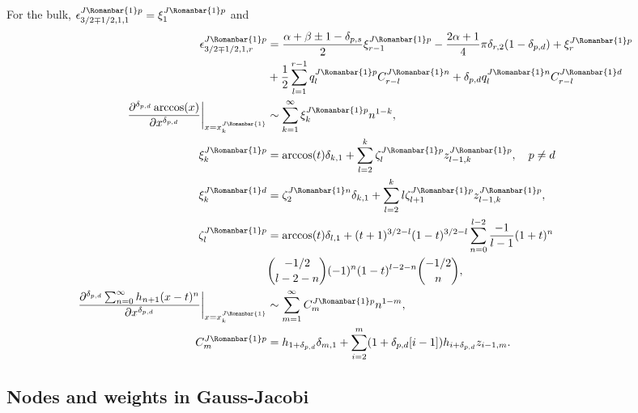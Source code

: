\documentclass[11pt]{article}
\newcommand*{\todo}[1]{{\color{red}?? TODO: #1 ??}}
\newcommand{\lln}{L{\tiny\Rleft} n}
\newcommand{\qj}{J}
\newcommand{\rb}{{\scriptsize \Romanbar{1}} }
\newcommand{\rl}{{\scriptsize \Romanbar{4}} }
\newcommand{\pg}{p}
\newcommand{\pn}{n}
\newcommand{\pd}{d}
\newcommand{\ps}{s}
\numberwithin{equation}{section}
\newcommand{\Rleft}{\Romanbar{4}}
\begin{document}
For the bulk, $\epsilon_{3/2 \mp 1/2,1,1}^{\qj\rb\pg} = \xi_{1}^{\qj\rb\pg}$ and
\begin{align}
	\epsilon_{3/2 \mp 1/2,1,r}^{\qj\rb\pg} & = \frac{\alpha +\beta \pm 1 -\delta_{\pg,\ps} }{2}\xi_{r-1}^{\qj\rb\pg} -\frac{2\alpha +1}{4} \pi \delta_{r,2} (1-\delta_{\pg,\pd}) + \xi_r^{\qj\rb\pg} \\
	& +\frac{1}{2} \sum_{l=1}^{r-1} q_l^{\qj\rb\pg} C_{r-l}^{\qj\rb\pn} + \delta_{\pg,\pd} q_l^{\qj\rb\pn} C_{r-l}^{\qj\rb\pd} \\ %
	\left. \frac{\partial^{\delta_{\pg,\pd}} \arccos(x) }{\partial x^{\delta_{\pg,\pd}}} \right|_{x=x_k^{\qj\rb} } & \sim \sum_{k=1}^\infty \xi_k^{\qj\rb\pg} n^{1-k}, \\ %
	\xi_k^{\qj\rb\pg} & = \arccos(t) \delta_{k,1} + \sum_{l=2}^k \zeta_l^{\qj\rb\pg} z_{l-1,k}^{\qj\rb\pg}, \quad \pg \neq \pd \\
	\xi_k^{\qj\rb\pd} & = \zeta_2^{\qj\rb\pn} \delta_{k,1} + \sum_{l=2}^k l \zeta_{l+1}^{\qj\rb\pg} z_{l-1,k}^{\qj\rb\pg}, \\
	\zeta_l^{\qj\rb\pg} & = \arccos(t) \delta_{l,1} + (t+1)^{3/2-l}(1-t)^{3/2-l}\sum_{n=0}^{l-2} \frac{-1}{l-1} (1+t)^n \\
	& {-1/2 \choose l-2-n} (-1)^n (1-t)^{l-2-n} {-1/2 \choose n}, \\
	\left.\frac{\partial^{\delta_{\pg,\pd}} \sum_{n=0}^\infty h_{n+1} (x -t)^n }{\partial x^{\delta_{\pg,\pd}} } \right|_{x=x_k^{\qj\rb} } & \sim \sum_{m=1}^\infty C_m^{\qj\rb\pg} n^{1-m}, \\
	C_m^{\qj\rb\pg} & = h_{1+\delta_{\pg,\pd}} \delta_{m,1} + \sum_{i=2}^m (1+\delta_{\pg,\pd}[i-1] ) h_{i+\delta_{\pg,\pd}} z_{i-1,m}.
\end{align}





\subsection{Nodes and weights in Gauss-Jacobi}  \label{SderxkwkGJ} %

\end{document}
